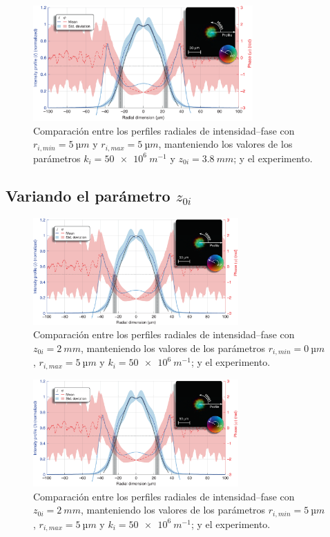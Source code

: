 \newpage

\begin{figure}[htbp]
  \centering
  \includegraphics[width=0.75\textwidth]{Figuras/anx_cmp_16.png}
  \caption*{Comparación entre los perfiles radiales de intensidad--fase con $r_{i,min}=\qty{5}{µm}$ y $r_{i,max}=\qty{5}{µm}$, manteniendo los valores de los parámetros $k_{i}=\qty{50e6}{m^{-1}}$ y $z_{0i}=\qty{3.8}{mm}$; y el experimento.}
\end{figure}

\subsection*{Variando el parámetro $z_{0i}$}

\begin{figure}[htbp]
  \centering
  \includegraphics[width=0.7\textwidth]{Figuras/anx_cmp_21.png}
  \caption*{Comparación entre los perfiles radiales de intensidad--fase con $z_{0i}=\qty{2}{mm}$, manteniendo los valores de los parámetros $r_{i,min}=\qty{0}{µm}$, $r_{i,max}=\qty{5}{µm}$ y $k_{i}=\qty{50e6}{m^{-1}}$; y el experimento.}
\end{figure}

\begin{figure}[htbp!]
  \centering
  \includegraphics[width=0.7\textwidth]{Figuras/anx_cmp_22.png}
  \caption*{Comparación entre los perfiles radiales de intensidad--fase con $z_{0i}=\qty{2}{mm}$, manteniendo los valores de los parámetros $r_{i,min}=\qty{5}{µm}$, $r_{i,max}=\qty{5}{µm}$ y $k_{i}=\qty{50e6}{m^{-1}}$; y el experimento.}
\end{figure}

